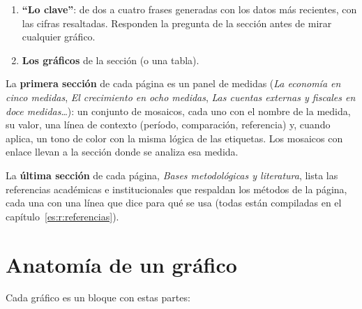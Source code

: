 \begin{enumerate}
\item \textbf{``Lo clave''}: de dos a cuatro frases generadas con los datos más recientes, con las cifras
  resaltadas. Responden la pregunta de la sección antes de mirar cualquier gráfico.
\item \textbf{Los gráficos} de la sección (o una tabla).
\end{enumerate}

La \textbf{primera sección} de cada página es un panel de medidas (\emph{La economía en cinco medidas},
\emph{El crecimiento en ocho medidas}, \emph{Las cuentas externas y fiscales en doce medidas}\ldots): un
conjunto de mosaicos, cada uno con el nombre de la medida, su valor, una línea de contexto (período,
comparación, referencia) y, cuando aplica, un tono de color con la misma lógica de las etiquetas. Los
mosaicos con enlace llevan a la sección donde se analiza esa medida.

La \textbf{última sección} de cada página, \emph{Bases metodológicas y literatura}, lista las referencias
académicas e institucionales que respaldan los métodos de la página, cada una con una línea que dice para qué
se usa (todas están compiladas en el capítulo~\ref{es:r:referencias}).

\section{Anatomía de un gráfico}
\label{es:u:grafico}
Cada gráfico es un bloque con estas partes:

